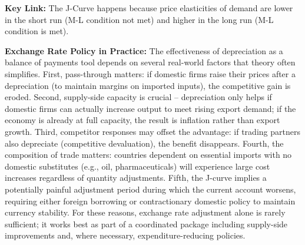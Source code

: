 \documentclass[11pt, a4paper, twoside]{book}
\begin{document}
\begin{coreidea}
\textbf{Key Link:} The J-Curve happens because price elasticities of demand are lower in the short run (M-L condition not met) and higher in the long run (M-L condition is met).
\end{coreidea}

\textbf{Exchange Rate Policy in Practice:} The effectiveness of depreciation as a balance of payments tool depends on several real-world factors that theory often simplifies. First, pass-through matters: if domestic firms raise their prices after a depreciation (to maintain margins on imported inputs), the competitive gain is eroded. Second, supply-side capacity is crucial -- depreciation only helps if domestic firms can actually increase output to meet rising export demand; if the economy is already at full capacity, the result is inflation rather than export growth. Third, competitor responses may offset the advantage: if trading partners also depreciate (competitive devaluation), the benefit disappears. Fourth, the composition of trade matters: countries dependent on essential imports with no domestic substitutes (e.g., oil, pharmaceuticals) will experience large cost increases regardless of quantity adjustments. Fifth, the J-curve implies a potentially painful adjustment period during which the current account worsens, requiring either foreign borrowing or contractionary domestic policy to maintain currency stability. For these reasons, exchange rate adjustment alone is rarely sufficient; it works best as part of a coordinated package including supply-side improvements and, where necessary, expenditure-reducing policies.
\end{document}

